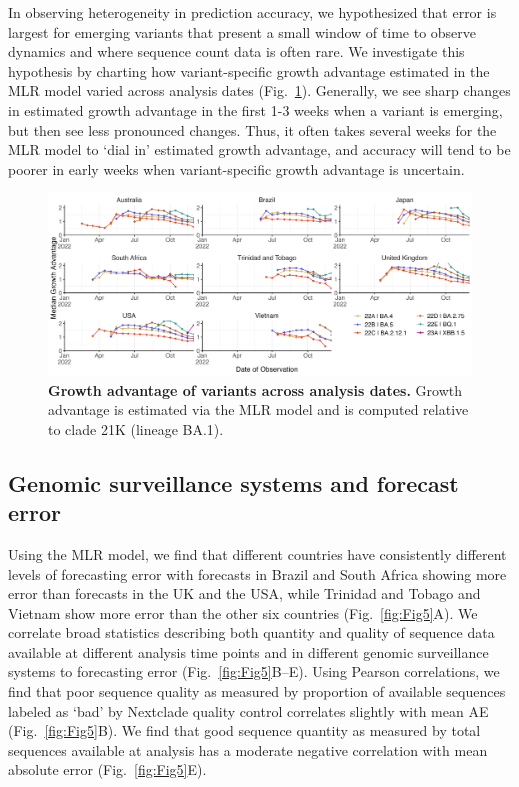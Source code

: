 In observing heterogeneity in prediction accuracy, we hypothesized that error is largest for emerging variants that present a small window of time to observe dynamics and where sequence count data is often rare.
We investigate this hypothesis by charting how variant-specific growth advantage estimated in the MLR model varied across analysis dates (Fig.~\ref{fig:Fig4}).
Generally, we see sharp changes in estimated growth advantage in the first 1-3 weeks when a variant is emerging, but then see less pronounced changes.
Thus, it often takes several weeks for the MLR model to `dial in' estimated growth advantage, and accuracy will tend to be poorer in early weeks when variant-specific growth advantage is uncertain.



\begin{figure}[tb!]
	\centering
    \includegraphics[width=1.0\textwidth]{figures/ga_estimates.png}
	\caption{
		\textbf{Growth advantage of variants across analysis dates.}
		Growth advantage is estimated via the MLR model and is computed relative to clade 21K (lineage BA.1).
	}
	\label{fig:Fig4}
\end{figure}





\subsection*{Genomic surveillance systems and forecast error}

Using the MLR model, we find that different countries have consistently different levels of forecasting error with forecasts in Brazil and South Africa showing more error than forecasts in the UK and the USA, while Trinidad and Tobago and Vietnam show more error than the other six countries (Fig.~\ref{fig:Fig5}A).
We correlate broad statistics describing both quantity and quality of sequence data available at different analysis time points and in different genomic surveillance systems to forecasting error (Fig.~\ref{fig:Fig5}B--E).
Using Pearson correlations, we find that poor sequence quality as measured by proportion of available sequences labeled as `bad' by Nextclade quality control \cite{aksamentov2021nextclade} correlates slightly with mean AE (Fig.~\ref{fig:Fig5}B).
We find that good sequence quantity as measured by total sequences available at analysis has a moderate negative correlation with mean absolute error (Fig.~\ref{fig:Fig5}E).

